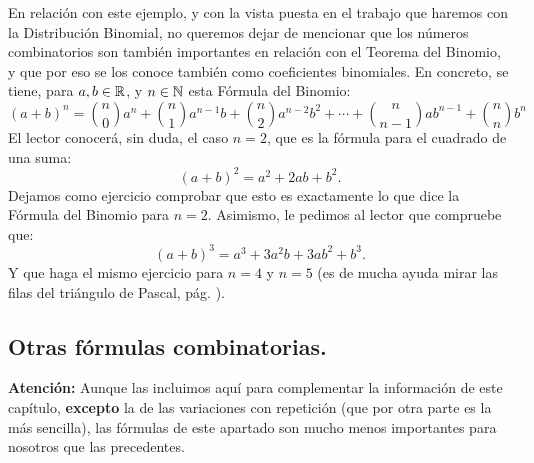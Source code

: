 En relación con este ejemplo, y con la vista puesta en el trabajo que haremos con la Distribución Binomial, no queremos dejar de mencionar que los números combinatorios son también importantes en relación con el Teorema del Binomio, y que por eso se los conoce también como {\sf coeficientes binomiales}. En concreto, se tiene, para $a,b\in\mathbb{R}$, y $n\in\mathbb{N}$ esta {\sf Fórmula del Binomio}:
 \begin{equation}\label{cap03:ecu:FormulaBinomio}
 (a+b)^n=\binom{n}{0}a^n+\binom{n}{1}a^{n-1}b+\binom{n}{2}a^{n-2}b^2+\cdots+\binom{n}{n-1}ab^{n-1}+\binom{n}{n}b^n
  \end{equation}
El lector conocerá, sin duda, el caso $n=2$, que es la fórmula para el cuadrado de una suma:
\[(a+b)^2=a^2+2ab+b^2.\]
Dejamos como ejercicio comprobar que esto es exactamente lo que dice la Fórmula del Binomio para $n=2$. Asimismo, le pedimos al lector que compruebe que:
\[(a+b)^3=a^3+3a^2b+3ab^2+b^3.\]
Y que haga el mismo ejercicio para $n=4$ y $n=5$ (es de mucha ayuda mirar las filas del triángulo de Pascal, pág. \pageref{cap03:ecu:TrianguloPascal}).

\subsection{Otras fórmulas combinatorias.}
\label{cap03:subsec:OtrasFormulasCombinatorias}
{\bf Atención:}
Aunque las incluimos aquí para complementar la información de este capítulo, {\bf excepto} la de las variaciones con repetición (que por otra parte es la más sencilla), las fórmulas de este apartado son mucho menos importantes para nosotros que las precedentes.

